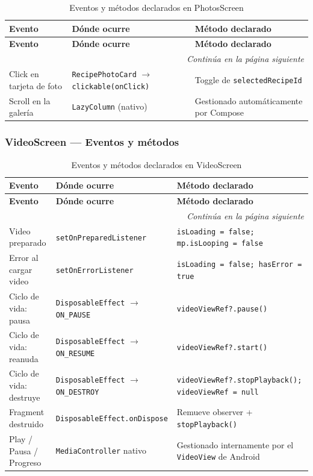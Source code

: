 \documentclass[stu, 12pt, letterpaper, donotrepeattitle, floatsintext, natbib]{apa7}
\begin{document}
\begin{longtable}{@{}p{2.8cm}p{3.7cm}p{9cm}@{}}
\caption{Eventos y métodos declarados en PhotosScreen}
\label{tab:evphotos}\\
\toprule
\textbf{Evento} & \textbf{Dónde ocurre} & \textbf{Método declarado} \\
\midrule
\endfirsthead
\toprule
\textbf{Evento} & \textbf{Dónde ocurre} & \textbf{Método declarado} \\
\midrule
\endhead
\midrule
\multicolumn{3}{r}{\small\textit{Continúa en la página siguiente}}\\
\endfoot
\bottomrule
\endlastfoot
Click en tarjeta de foto & \texttt{RecipePhotoCard} $\rightarrow$ \texttt{clickable(onClick)} & Toggle de \texttt{selectedRecipeId} \\[3pt]
Scroll en la galería & \texttt{LazyColumn} (nativo) & Gestionado automáticamente por Compose \\
\end{longtable}

\subsubsection{VideoScreen --- Eventos y métodos}

\begin{longtable}{@{}p{2.5cm}p{4cm}p{9cm}@{}}
\caption{Eventos y métodos declarados en VideoScreen}
\label{tab:evvideo}\\
\toprule
\textbf{Evento} & \textbf{Dónde ocurre} & \textbf{Método declarado} \\
\midrule
\endfirsthead
\toprule
\textbf{Evento} & \textbf{Dónde ocurre} & \textbf{Método declarado} \\
\midrule
\endhead
\midrule
\multicolumn{3}{r}{\small\textit{Continúa en la página siguiente}}\\
\endfoot
\bottomrule
\endlastfoot
Video preparado & \texttt{setOnPreparedListener} & \texttt{isLoading = false; mp.isLooping = false} \\[3pt]
Error al cargar video & \texttt{setOnErrorListener} & \texttt{isLoading = false; hasError = true} \\[3pt]
Ciclo de vida: pausa & \texttt{DisposableEffect} $\rightarrow$ \texttt{ON\_PAUSE} & \texttt{videoViewRef?.pause()} \\[3pt]
Ciclo de vida: reanuda & \texttt{DisposableEffect} $\rightarrow$ \texttt{ON\_RESUME} & \texttt{videoViewRef?.start()} \\[3pt]
Ciclo de vida: destruye & \texttt{DisposableEffect} $\rightarrow$ \texttt{ON\_DESTROY} & \texttt{videoViewRef?.stopPlayback(); videoViewRef = null} \\[3pt]
Fragment destruido & \texttt{DisposableEffect.onDispose} & Remueve observer + \texttt{stopPlayback()} \\[3pt]
Play / Pausa / Progreso & \texttt{MediaController} nativo & Gestionado internamente por el \texttt{VideoView} de Android \\
\end{longtable}
\end{document}
